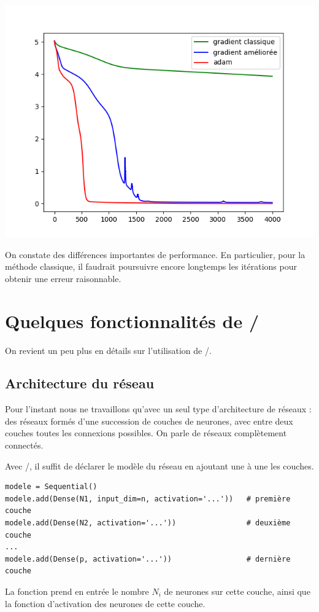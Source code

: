 \documentclass[11pt,class=report,crop=false]{standalone}
\begin{document}
\begin{center}
\includegraphics[scale=\myscale,scale=0.5]{figures/unevar-fonction-leserreurs}
\end{center}

On constate des différences importantes de performance. En particulier, pour la méthode classique, il faudrait poursuivre encore longtemps les itérations pour obtenir une erreur raisonnable.


\section{Quelques fonctionnalités de \tensorflow/\keras}

On revient un peu plus en détails sur l'utilisation de  \tensorflow/\keras.

\subsection{Architecture du réseau}

Pour l'instant nous ne travaillons qu'avec un seul type d'architecture de réseaux : des réseaux formés d'une succession de couches de neurones, avec entre deux couches toutes les connexions possibles. On parle de réseaux complètement connectés.



Avec \tensorflow/\keras, il suffit de déclarer le modèle du réseau en ajoutant une à une les couches.
\begin{lstlisting} 
modele = Sequential()
modele.add(Dense(N1, input_dim=n, activation='...'))   # première couche
modele.add(Dense(N2, activation='...'))                # deuxième couche
...
modele.add(Dense(p, activation='...'))                 # dernière couche
\end{lstlisting}
La fonction  prend en entrée le nombre $N_i$ de neurones sur cette couche, ainsi que la fonction d'activation des neurones de cette couche.
\end{document}

